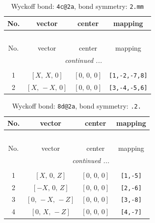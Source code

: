 \documentclass[fleqn,8pt]{jsarticle}
\begin{document}
\renewcommand{\arraystretch}{1.2}
\begin{longtable}{cccc}
\caption{Wyckoff bond: {\tt 4c@2a}, bond symmetry: {\tt 2.mm}}
 \\
 \hline \hline
No. & vector & center & mapping \\ \hline \endfirsthead

\multicolumn{3}{l}{\tablename\ \thetable{}} \\
 \hline \hline
No. & vector & center & mapping \\ \hline \endhead

 \hline \hline
\multicolumn{3}{r}{\footnotesize\it continued ...} \\ \endfoot

 \hline \hline
\multicolumn{3}{r}{} \\ \endlastfoot

1 & $\left[ X,\, X,\, 0 \right]$ & $\left[ 0,\, 0,\, 0 \right]$ & {\tt [1,-2,-7,8]} \\ \hline
2 & $\left[ X,\, - X,\, 0 \right]$ & $\left[ 0,\, 0,\, 0 \right]$ & {\tt [3,-4,-5,6]} \\
\end{longtable}
\renewcommand{\arraystretch}{1.2}
\begin{longtable}{cccc}
\caption{Wyckoff bond: {\tt 8d@2a}, bond symmetry: {\tt .2.}}
 \\
 \hline \hline
No. & vector & center & mapping \\ \hline \endfirsthead

\multicolumn{3}{l}{\tablename\ \thetable{}} \\
 \hline \hline
No. & vector & center & mapping \\ \hline \endhead

 \hline \hline
\multicolumn{3}{r}{\footnotesize\it continued ...} \\ \endfoot

 \hline \hline
\multicolumn{3}{r}{} \\ \endlastfoot

1 & $\left[ X,\, 0,\, Z \right]$ & $\left[ 0,\, 0,\, 0 \right]$ & {\tt [1,-5]} \\ \hline
2 & $\left[ - X,\, 0,\, Z \right]$ & $\left[ 0,\, 0,\, 0 \right]$ & {\tt [2,-6]} \\ \hline
3 & $\left[ 0,\, - X,\, - Z \right]$ & $\left[ 0,\, 0,\, 0 \right]$ & {\tt [3,-8]} \\ \hline
4 & $\left[ 0,\, X,\, - Z \right]$ & $\left[ 0,\, 0,\, 0 \right]$ & {\tt [4,-7]} \\
\end{longtable}
\end{document}
